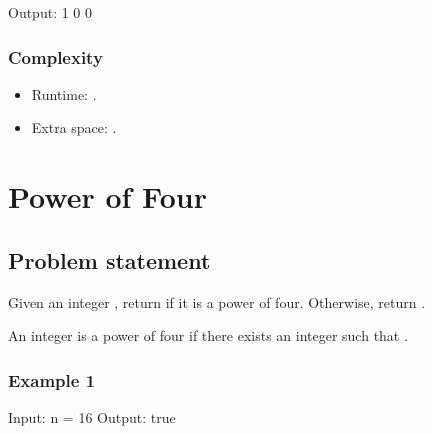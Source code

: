 \documentclass[letterpaper,12pt,english]{book}
\begin{document}
\begin{sphinxVerbatim}[commandchars=\\\{\}]
Output:
1
0
0
\end{sphinxVerbatim}


\subsubsection{Complexity}
\label{\detokenize{Mathematics/09_MTH_326_Power_of_Three:id2}}\begin{itemize}
\item {} 
\sphinxAtStartPar
Runtime: .

\item {} 
\sphinxAtStartPar
Extra space: .

\end{itemize}

\sphinxstepscope


\section{Power of Four}
\label{\detokenize{Mathematics/09_MTH_342_Power_of_Four:power-of-four}}\label{\detokenize{Mathematics/09_MTH_342_Power_of_Four::doc}}

\subsection{Problem statement\sphinxfootnotemark[125]}
\label{\detokenize{Mathematics/09_MTH_342_Power_of_Four:problem-statement}}%
\begin{footnotetext}[125]\sphinxAtStartFootnote
{}
%
\end{footnotetext}\ignorespaces 
\sphinxAtStartPar
Given an integer , return  if it is a power of four. Otherwise, return .

\sphinxAtStartPar
An integer  is a power of four if there exists an integer  such that .


\subsubsection{Example 1}
\label{\detokenize{Mathematics/09_MTH_342_Power_of_Four:example-1}}
\begin{sphinxVerbatim}[commandchars=\\\{\}]
Input: n = 16
Output: true
\end{sphinxVerbatim}
\end{document}
